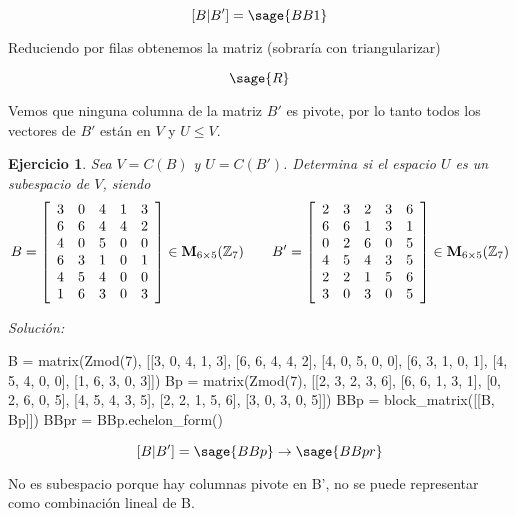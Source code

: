 \documentclass{amsart}
\newtheorem{ejer}{Ejercicio}
\begin{document}
$$ [B|B'] = \sage{BB1} $$

Reduciendo por filas obtenemos la matriz (sobraría con triangularizar)

$$ \sage{R} $$

Vemos que ninguna columna de la matriz $B'$ es pivote, por lo tanto todos los 
vectores de $B'$ están en $V$ y $U \leq V$.



\begin{ejer} Sea $V = C(B)$ y $U = C(B')$. Determina si el espacio $U$ es un 
subespacio de $V$, siendo 
\[B = \left[\begin{array}{rrrrr}
3 & 0 & 4 & 1 & 3 \\
6 & 6 & 4 & 4 & 2 \\
4 & 0 & 5 & 0 & 0 \\
6 & 3 & 1 & 0 & 1 \\
4 & 5 & 4 & 0 & 0 \\
1 & 6 & 3 & 0 & 3
\end{array}\right] \in {\bf M}_{6 \times 5}({\mathbb Z}_{7}) \qquad
B' = \left[\begin{array}{rrrrr}
2 & 3 & 2 & 3 & 6 \\
6 & 6 & 1 & 3 & 1 \\
0 & 2 & 6 & 0 & 5 \\
4 & 5 & 4 & 3 & 5 \\
2 & 2 & 1 & 5 & 6 \\
3 & 0 & 3 & 0 & 5
\end{array}\right] \in {\bf M}_{6 \times 5}({\mathbb Z}_{7}) \]
\end{ejer}

{\it Soluci\'on:}

\begin{sageblock}
B = matrix(Zmod(7), [[3, 0, 4, 1, 3], [6, 6, 4, 4, 2], [4, 0, 5, 0, 0], [6, 3, 1, 0, 1], [4, 5, 4, 0, 0], [1, 6, 3, 0, 3]])
Bp = matrix(Zmod(7), [[2, 3, 2, 3, 6], [6, 6, 1, 3, 1], [0, 2, 6, 0, 5], [4, 5, 4, 3, 5], [2, 2, 1, 5, 6], [3, 0, 3, 0, 5]])
BBp = block_matrix([[B, Bp]])
BBpr = BBp.echelon_form()
\end{sageblock}

$$
	[B|B'] = \sage{BBp} \to \sage{BBpr}
$$

No es subespacio porque hay columnas pivote en B', no se puede representar como combinación lineal de B.

\end{document}
